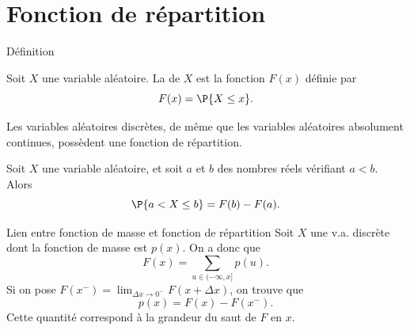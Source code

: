 \documentclass[nuit,charter,pied]{BeamerJS}
\begin{document}
\section{Fonction de répartition}
\begin{frame}{Définition}
	\begin{defn}{}
		Soit $X$ une variable aléatoire. La  de $X$ est la fonction $F(x)$ définie par
		\[F(x)=\P{X\leq x}.\]
	\end{defn}
	Les variables aléatoires discrètes, de même que les variables aléatoires absolument continues, possèdent une fonction de répartition.\\
	\begin{thm}
		Soit $X$ une variable aléatoire, et soit $a$ et $b$ des nombres réels vérifiant $a<b$. Alors
		\[\P{a<X\leq b}=F(b)-F(a).\]
	\end{thm}
\end{frame}
\begin{frame}{Lien entre fonction de masse et fonction de répartition}
	Soit $X$ une v.a. discrète dont la fonction de masse est $p(x)$. On a donc que
	\[F(x)=\sum_{u\in(-\infty,x]}p(u).\]
	Si on pose $F(x^-)=\lim_{\Delta x\rightarrow 0^-}F(x+\Delta x)$, on trouve que
	\[p(x)=F(x)-F(x^-).\]
	Cette quantité correspond à la grandeur du saut de $F$ en $x$.
\end{frame}
\end{document}
